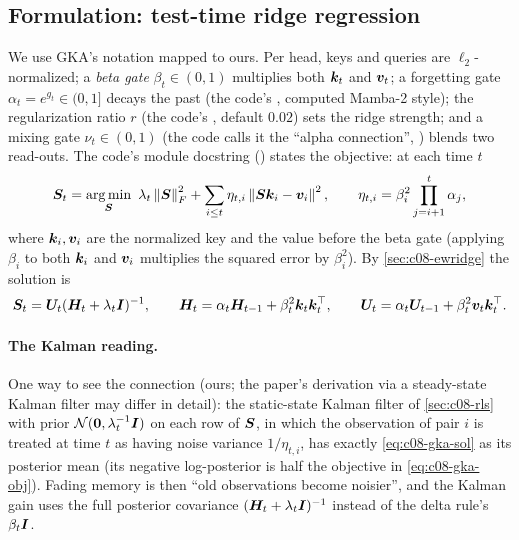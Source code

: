 \subsection{Formulation: test-time ridge regression}\label{sec:c08-gka-form}

We use GKA's notation mapped to ours. Per head, keys and queries are $\ell_2$-normalized; a
\emph{beta gate} $\beta_t\in(0,1)$ multiplies both $\bm{k}_t$ and $\bm{v}_t$; a forgetting gate
$\alpha_t=e^{g_t}\in(0,1]$ decays the past (the code's , computed Mamba-2 style); the
regularization ratio $r$ (the code's , default $0.02$) sets the ridge strength;
and a mixing gate $\nu_t\in(0,1)$ (the code calls it the ``alpha connection'', )
blends two read-outs. The code's module docstring
()
states the objective: at each time $t$
\begin{equation}\label{eq:c08-gka-obj}
  \bm{S}_t=\operatorname*{arg\,min}_{\bm{S}}\ \lambda_t\left\lVert \bm{S}\right\rVert_F^2+\sum_{i\le t}\eta_{t,i}\left\lVert \bm{S}\bm{k}_i-\bm{v}_i\right\rVert^2,
  \qquad \eta_{t,i}=\beta_i^2\prod_{j=i+1}^{t}\alpha_j ,
\end{equation}
where $\bm{k}_i,\bm{v}_i$ are the normalized key and the value before the beta gate (applying $\beta_i$ to
both $\bm{k}_i$ and $\bm{v}_i$ multiplies the squared error by $\beta_i^2$). By \cref{sec:c08-ewridge} the
solution is
\begin{equation}\label{eq:c08-gka-sol}
  \bm{S}_t=\bm{U}_t(\bm{H}_t+\lambda_t\bm{I})^{-1},\qquad
  \bm{H}_t=\alpha_t\bm{H}_{t-1}+\beta_t^2\bm{k}_t\bm{k}_t^{\top},\qquad
  \bm{U}_t=\alpha_t\bm{U}_{t-1}+\beta_t^2\bm{v}_t\bm{k}_t^{\top} .
\end{equation}

\paragraph{The Kalman reading.} One way to see the connection (ours; the paper's derivation via a
steady-state Kalman filter may differ in detail): the static-state Kalman filter of
\cref{sec:c08-rls} with prior $\mathcal{N}(\bm{0},\lambda_t^{-1}\bm{I})$ on each row of $\bm{S}$, in which
the observation of pair $i$ is treated at time $t$ as having noise variance $1/\eta_{t,i}$, has
exactly \eqref{eq:c08-gka-sol} as its posterior mean (its negative log-posterior is half the
objective in \eqref{eq:c08-gka-obj}). Fading memory is then ``old observations
become noisier'', and the Kalman gain uses the full posterior covariance
$(\bm{H}_t+\lambda_t\bm{I})^{-1}$ instead of the delta rule's $\beta_t\bm{I}$.

